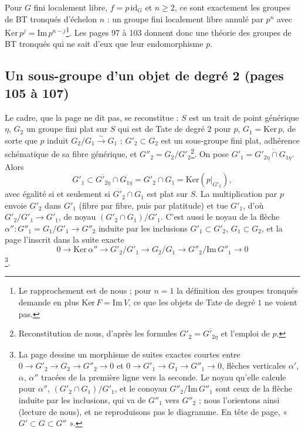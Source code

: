 \documentclass[11pt,a4paper]{article}
\begin{document}
Pour $G$ fini localement libre, $f = p\,\mathrm{id}_G$ et $n \geq 2$, ce
sont exactement les groupes de BT tronqués d'échelon $n$ : un groupe fini
localement libre annulé par $p^{n}$ avec $\mathrm{Ker}\, p^{j} = \mathrm{Im}\, p^{n-j}$\footnote{Le
rapprochement est de nous ; pour $n = 1$ la définition des groupes
tronqués demande en plus $\mathrm{Ker}\, F = \mathrm{Im}\, V$, ce que les
objets de Tate de degré $1$ ne voient pas.}. Les pages 97 à 103 donnent
donc une théorie des groupes de BT tronqués qui ne sait d'eux que leur
endomorphisme $p$.

\subsection*{Un sous-groupe d'un objet de degré 2 (pages 105 à 107)}

Le cadre, que la page ne dit pas, se reconstitue : $S$ est un trait de
point générique $\eta$, $G_2$ un groupe fini plat sur $S$ qui est de Tate
de degré $2$ pour $p$, $G_1 = \mathrm{Ker}\, p$, de sorte que $p$ induit
$G_2/G_1 \xrightarrow{\sim} G_1$ ; $G'_2 \subset G_2$ est un sous-groupe
fini plat, adhérence schématique de sa fibre générique, et $G''_2 =
G_2/G'_2$\footnote{Reconstitution de nous, d'après les formules
$G'_2 = \overline{G'_{2\eta}}$ et l'emploi de $p$.}. On pose $G'_1 =
\overline{G'_{2\eta} \cap G_{1\eta}}$. Alors
\[
G'_1 \subset \overline{G'_{2\eta}} \cap \overline{G_{1\eta}} = G'_2 \cap G_1
= \mathrm{Ker}(p|_{G'_2}),
\]
avec égalité si et seulement si $G'_2 \cap G_1$ est plat sur $S$. La
multiplication par $p$ envoie $G'_2$ dans $G'_1$ (fibre par fibre, puis
par platitude) et tue $G'_1$, d'où $G'_2/G'_1 \to G'_1$, de noyau
$(G'_2 \cap G_1)/G'_1$. C'est aussi le noyau de la flèche $\alpha'' \colon
G''_1 = G_1/G'_1 \to G''_2$ induite par les inclusions $G'_1 \subset G'_2$,
$G_1 \subset G_2$, et la page l'inscrit dans la suite exacte
\[
0 \to \mathrm{Ker}\, \alpha'' \to G'_2/G'_1 \to G_2/G_1 \to
G''_2/\mathrm{Im}\, G''_1 \to 0
\]
\footnote{La page dessine un morphisme de suites exactes courtes entre
$0 \to G'_2 \to G_2 \to G''_2 \to 0$ et $0 \to G'_1 \to G_1 \to G''_1 \to
0$, flèches verticales $\alpha'$, $\alpha$, $\alpha''$ tracées de la
première ligne vers la seconde. Le noyau qu'elle calcule pour $\alpha''$,
$(G'_2 \cap G_1)/G'_1$, et le conoyau $G''_2/\mathrm{Im}\, G''_1$ sont
ceux de la flèche induite par les inclusions, qui va de $G''_1$ vers
$G''_2$ ; nous l'orientons ainsi (lecture de nous), et ne reproduisons
pas le diagramme. En tête de page, « $G' \subset G \subset G''$ ».}.
\end{document}
